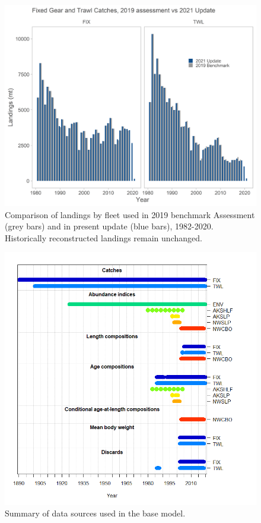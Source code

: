 \documentclass[11pt,
  english,
  a4paper,
]{article}
\begin{document}
\begin{figure}
\centering
\includegraphics[width=1\textwidth,height=1\textheight]{figs/coastwide_catch_comparison.png}
\caption{Comparison of landings by fleet used in 2019 benchmark Assessment (grey bars) and in present update (blue bars), 1982-2020. Historically reconstructed landings remain unchanged. \label{fig:catch_comparison}}
\end{figure}

\tagmcend\tagstructend


\begin{figure}
\centering
\includegraphics[width=1\textwidth,height=1\textheight]{figs/data-plot.png}
\caption{Summary of data sources used in the base model.\label{fig:data-plot}}
\end{figure}
\end{document}
